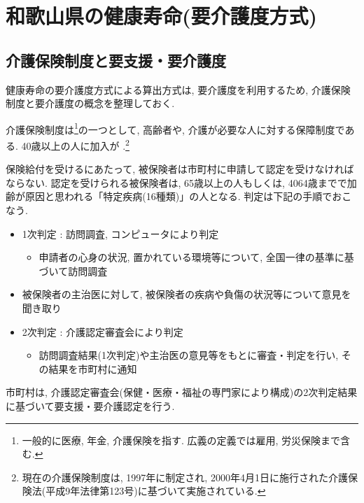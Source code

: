 \section{和歌山県の健康寿命(要介護度方式)}
\subsection{介護保険制度と要支援・要介護度}
健康寿命の要介護度方式による算出方式は, 要介護度を利用するため, 介護保険制度と要介護度の概念を整理しておく.

介護保険制度は\footnote{一般的に医療, 年金, 介護保険を指す. 広義の定義では雇用, 労災保険まで含む.
}の一つとして,
高齢者や, 介護が必要な人に対する保障制度である.
40歳以上の人に加入が
.\footnote{
	現在の介護保険制度は, 1997年に制定され, 2000年4月1日に施行された介護保険法(平成9年法律第123号)に基づいて実施されている.
}


保険給付を受けるにあたって, 被保険者は市町村に申請して認定を受けなければならない.
認定を受けられる被保険者は, 65歳以上の人もしくは, 4064歳までで加齢が原因と思われる「特定疾病(16種類)」の人となる.
判定は下記の手順でおこなう.
\begin{itemize} \setlength{\itemsep}{-0.5mm} \setlength{\parskip}{-0.5mm}
	\item 1次判定  :  訪問調査, コンピュータにより判定
	      \begin{itemize} \setlength{\itemsep}{-0.5mm} \setlength{\parskip}{-0.5mm}
		      \item 申請者の心身の状況, 置かれている環境等について, 全国一律の基準に基づいて訪問調査
	      \end{itemize}
	\item 被保険者の主治医に対して, 被保険者の疾病や負傷の状況等について意見を聞き取り
	\item 2次判定  :  介護認定審査会により判定
	      \begin{itemize} \setlength{\itemsep}{-0.5mm} \setlength{\parskip}{-0.5mm}
		      \item 訪問調査結果(1次判定)や主治医の意見等をもとに審査・判定を行い, その結果を市町村に通知
	      \end{itemize}
\end{itemize}
市町村は, 介護認定審査会(保健・医療・福祉の専門家により構成)の2次判定結果に基づいて要支援・要介護認定を行う.


